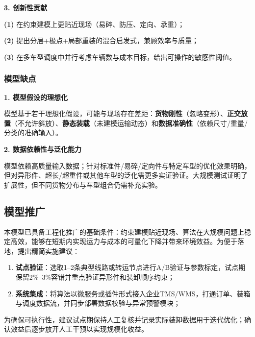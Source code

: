 \documentclass{MMCStyle}
\begin{document}
\noindent\textbf{3. 创新性贡献}

\textbf{(1)} 在约束建模上更贴近现场（易碎、防压、定向、承重）；

\textbf{(2)} 提出分层+极点+局部重装的混合启发式，兼顾效率与质量；

\textbf{(3)} 在多车型调度中并行考虑车辆数与成本目标，给出可操作的敏感性阈值。

\subsubsection{模型缺点}

\noindent\textbf{1. 模型假设的理想化}

模型基于若干理想化假设，可能与现场存在差距：\textbf{货物刚性}（忽略变形）、\textbf{正交放置}（不允许斜放）、\textbf{静态装载}（未建模运输动态）和\textbf{数据准确性}（依赖尺寸/重量/分类的准确输入）。

\noindent\textbf{2. 数据依赖性与泛化能力}

模型依赖高质量输入数据；针对标准件/易碎/定向件与特定车型的优化效果明确，但对异形件、超长/超重件或其他车型的泛化需更多实证验证。大规模测试证明了扩展性，但不同货物分布与车型组合仍需补充实验。

\subsection{模型推广}

\noindent 本模型已具备工程化推广的基础条件：约束建模贴近现场、算法在大规模问题上稳定高效，能够在短期内实现运力与成本的可量化下降并带来环境效益。为便于落地，提出精简实施建议：
\begin{enumerate}
    \item \textbf{试点验证}：选取1--2条典型线路或转运节点进行A/B验证与参数标定，试点期保留2\%--3\%容错并重点验证异形件和装卸顺序约束；
    \item \textbf{系统集成}：将算法以微服务或插件形式接入企业TMS/WMS，打通订单、装箱与调度数据流，并同步部署数据校验与异常预警模块；
\end{enumerate}
\noindent 为确保可执行性，建议试点期保持人工复核并记录实际装卸数据用于迭代优化；确认效益后逐步放开人工干预以实现规模化收益。



\newpage
\end{document}
